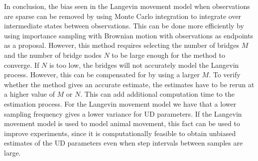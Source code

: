 

In conclusion, the bias seen in the Langevin movement model when observations are sparse can be removed by using Monte Carlo integration to integrate over intermediate states between observations. This can be done more efficiently by using importance sampling with Brownian motion with observations as endpoints as a proposal. However, this method requires selecting the number of bridges $M$ and the number of bridge nodes $N$ to be large enough for the method to converge. If $N$ is too low, the bridges will not accurately model the Langevin process. However, this can be compensated for by using a larger $M$. To verify whether the method gives an accurate estimate, the estimates have to be rerun at a higher value of $M$ or $N$. This can add additional computation time to the estimation process. For the Langevin movement model we have that a lower sampling frequency gives a lower variance for UD parameters. If the Langevin movement model is used to model animal movement, this fact can be used to improve experiments, since it is computationally feasible to obtain unbiased estimates of the UD parameters even when step intervals between samples are large.








 